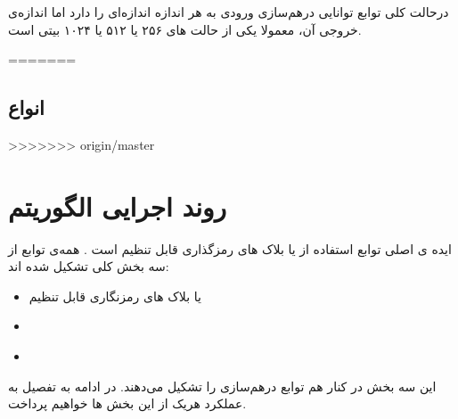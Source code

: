   درحالت کلی توابع
   توانایی درهم‌سازی ورودی به هر اندازه اندازه‌ای را دارد اما اندازه‌ی خروجی آن، معمولا یکی از حالت های ۲۵۶ یا ۵۱۲ یا ۱۰۲۴ بیتی است. 
  

\pagebreak
=======
\subsection{
	انواع
}
>>>>>>> origin/master
\section{
	روند اجرایی الگوریتم
}
ایده ی اصلی توابع   استفاده از
\textit{ }
  یا بلاک های رمزگذاری قابل تنظیم است .
همه‌ی توابع 
از سه بخش کلی تشکیل شده اند:
\begin{itemize}
	\item 
	یا بلاک های رمزنگاری قابل تنظیم
	\item

	\item
	\textbf{ } 
	
\end{itemize}
این سه بخش در کنار هم توابع درهم‌سازی
را تشکیل می‌دهند.
 در ادامه به تفصیل به عملکرد هریک از این بخش ها خواهیم‌ پرداخت.
 

